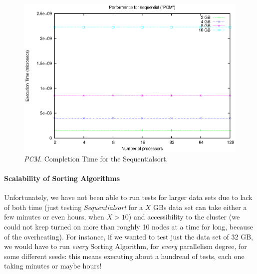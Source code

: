\begin{figure}[t]
    \begin{center}
        \includegraphics[scale=0.6]{plots/test_01_PCM/NxTxM/sequential_PCM_NxTxM_huge}
    \end{center}
    \caption{\textit{PCM}. Completion Time for the Sequentialsort.}
    \label{sequential-PCM}
\end{figure}

\paragraph{Scalability of Sorting Algorithms}
Unfortunately, we have not been able to run tests for larger data sets due to lack of both time (just testing \textit{Sequentialsort} for a $X$ GBs data set can take either a few minutes or even hours, when $X > 10$) and accessibility to the cluster (we could not keep turned on more than roughly 10 nodes at a time for long, because of the overheating). For instance, if we wanted to test just the data set of 32 GB, we would have to run \textit{every} Sorting Algorithm, for \textit{every} parallelism degree, for some different seeds: this means executing about a hundread of tests, each one taking minutes or maybe hours!  

